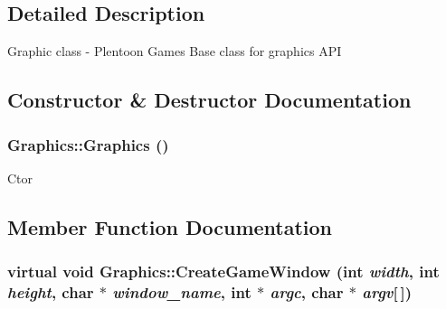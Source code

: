 \subsection{Detailed Description}
Graphic class - Plentoon Games Base class for graphics API 

\subsection{Constructor \& Destructor Documentation}
\hypertarget{class_graphics_f2e8fe67fd31ec263c843a6e28b29d3c}{
\subsubsection[Graphics]{\setlength{\rightskip}{0pt plus 5cm}Graphics::Graphics ()}}
\label{class_graphics_f2e8fe67fd31ec263c843a6e28b29d3c}


Ctor 

\subsection{Member Function Documentation}
\hypertarget{class_graphics_1683212d612a49e39003b2c4def5f5ec}{
\subsubsection[CreateGameWindow]{\setlength{\rightskip}{0pt plus 5cm}virtual void Graphics::CreateGameWindow (int {\em width}, \/  int {\em height}, \/  char $\ast$ {\em window\_\-name}, \/  int $\ast$ {\em argc}, \/  char $\ast$ {\em argv}\mbox{[}$\,$\mbox{]})}}
\label{class_graphics_1683212d612a49e39003b2c4def5f5ec}


